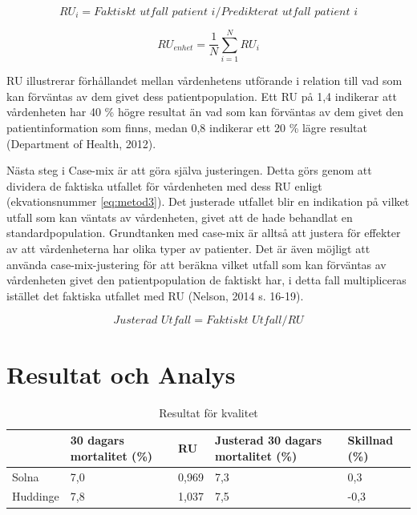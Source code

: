 \begin{equation}
\label{eq:metod1}
	RU_i = Faktiskt \,\,  utfall \,\, patient \,\, i/Predikterat \,\, utfall \,\, patient \,\, i
\end{equation}

\begin{equation}
\label{eq:metod2}
	RU_{enhet} = \frac{1}{N} \sum_{i=1}^{N} RU_i
\end{equation}


RU illustrerar förhållandet mellan vårdenhetens utförande i relation till vad som kan förväntas av dem givet dess patientpopulation. Ett RU på 1,4 indikerar att vårdenheten har 40 \% högre resultat än vad som kan förväntas av dem givet den patientinformation som finns, medan 0,8 indikerar ett 20 \% lägre resultat (Department of Health, 2012).

Nästa steg i Case-mix är att göra själva justeringen. Detta görs genom att dividera de faktiska utfallet för vårdenheten med dess RU enligt (ekvationsnummer \ref{eq:metod3}). Det justerade utfallet blir en indikation på vilket utfall som kan väntats av vårdenheten, givet att de hade behandlat en standardpopulation. Grundtanken med case-mix är alltså att justera för effekter av att vårdenheterna har olika typer av patienter. Det är även möjligt att använda case-mix-justering för att beräkna vilket utfall som kan förväntas av vårdenheten givet den patientpopulation de faktiskt har, i detta fall multipliceras istället det faktiska utfallet med RU (Nelson, 2014 s. 16-19).

\begin{equation}
\label{eq:metod3}
	Justerad \,\, Utfall = Faktiskt \,\, Utfall/RU
\end{equation}


\section{Resultat och Analys}

\begin{table}[h]
\centering
\caption{Resultat för kvalitet}
\label{tab:kvalres}
\begin{tabular}{|p{2cm}|p{3cm}|p{1cm}|p{4cm}|p{2cm}|}
\hline
         & 30 dagars mortalitet (\%) & RU    & Justerad 30 dagars mortalitet (\%) & Skillnad (\%) \\ \hline
Solna    & 7,0                      & 0,969 & 7,3                               & 0,3          \\ \hline
Huddinge & 7,8                      & 1,037 & 7,5                               & -0,3         \\ \hline
\end{tabular}
\end{table}


